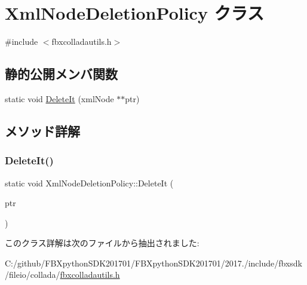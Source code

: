 \hypertarget{class_xml_node_deletion_policy}{}\section{Xml\+Node\+Deletion\+Policy クラス}
\label{class_xml_node_deletion_policy}


{\ttfamily \#include $<$fbxcolladautils.\+h$>$}

\subsection*{静的公開メンバ関数}
\begin{DoxyCompactItemize}
\item 
static void \hyperlink{class_xml_node_deletion_policy_ada232e48683ac2dd99af2b0782afcff8}{Delete\+It} (xml\+Node $\ast$$\ast$ptr)
\end{DoxyCompactItemize}


\subsection{メソッド詳解}
\mbox{\label{class_xml_node_deletion_policy_ada232e48683ac2dd99af2b0782afcff8}} 
\subsubsection{\texorpdfstring{Delete\+It()}{DeleteIt()}}
{\footnotesize\ttfamily static void Xml\+Node\+Deletion\+Policy\+::\+Delete\+It (\begin{DoxyParamCaption}\item[{xml\+Node $\ast$$\ast$}]{ptr }\end{DoxyParamCaption})\hspace{0.3cm}{\ttfamily [static]}}



このクラス詳解は次のファイルから抽出されました\+:\begin{DoxyCompactItemize}
\item 
C\+:/github/\+F\+B\+Xpython\+S\+D\+K201701/\+F\+B\+Xpython\+S\+D\+K201701/2017./include/fbxsdk/fileio/collada/\hyperlink{fbxcolladautils_8h}{fbxcolladautils.\+h}\end{DoxyCompactItemize}
